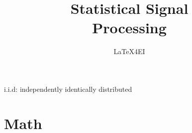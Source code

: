 \documentclass[english]{latex4ei/latex4ei_sheet}
\title{Statistical Signal\\ Processing}
\author{LaTeX4EI}					%
\begin{document}
\maketitle   %

\begin{symbolbox}
i.i.d: independently identically distributed	
\end{symbolbox}

\section{Math}
\end{document}
